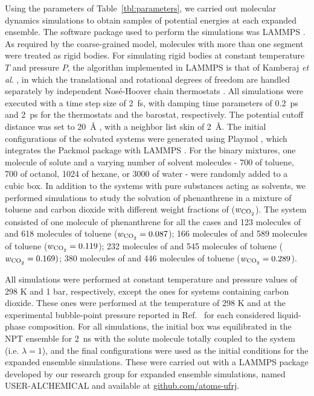 \documentclass[preprint]{elsarticle}
\begin{document}
	Using the parameters of Table~\ref{tbl:parameters}, we carried out molecular dynamics simulations to obtain samples of potential energies at each expanded ensemble. The software package used to perform the simulations was LAMMPS \cite{lammps}. As required by the coarse-grained model, molecules with more than one segment were treated as rigid bodies. For simulating rigid bodies at constant temperature $T$ and pressure $P$, the algorithm implemented in LAMMPS is that of Kamberaj \textit{et al}. \cite{kamberaj}, in which the translational and rotational degrees of freedom are handled separately by independent Nos\'{e}-Hoover chain thermostats \cite{PhysRevA.31.1695}. All simulations were executed with a time step size of 2~fs, with damping time parameters of 0.2~ps and 2~ps for the thermostats and the barostat, respectively. The potential cutoff distance was set to 20~$\text{\AA}$ \cite{muller2017}, with a neighbor list skin of 2~$\text{\AA}$. The initial configurations of the solvated systems were generated using Playmol \cite{playmol}, which integrates the Packmol package \cite{packmol} with LAMMPS \cite{lammps}. For the binary mixtures, one molecule of solute and a varying number of solvent molecules - 700 of toluene, 700 of octanol, 1024 of hexane, or 3000 of water - were randomly added to a cubic box. In addition to the systems with pure substances acting as solvents, we performed simulations to study the solvation of phenanthrene in a mixture of toluene and carbon dioxide with different weight fractions of  ($w_\text{\ce{CO_2}}$). The system consisted of one molecule of phenanthrene for all the cases and 123 molecules of  and 618 molecules of toluene ($w_\text{\ce{CO_2}} = 0.087$); 166 molecules of  and 589 molecules of toluene ($w_\text{\ce{CO_2}} = 0.119$); 232 molecules of  and 545 molecules of toluene ($w_\text{\ce{CO_2}} = 0.169)$; 380 molecules of  and 446 molecules of toluene ($w_\text{\ce{CO_2}} = 0.289$).
	
	All simulations were performed at constant temperature and pressure values of 298 K and 1 bar, respectively, except the ones for systems containing carbon dioxide. These ones were performed at the temperature of 298 K and at the experimental bubble-point pressure reported in Ref.~\cite{co2toliq} for each considered liquid-phase composition. For all simulations, the initial box was equilibrated in the NPT ensemble for 2~ns with the solute molecule totally coupled to the system (i.e. $\lambda = 1$), and the final configurations were used as the initial conditions for the expanded ensemble simulations. These were carried out with a LAMMPS package developed by our research group for expanded ensemble simulations, named USER-ALCHEMICAL and available at \url{github.com/atoms-ufrj}.
	
\end{document}
